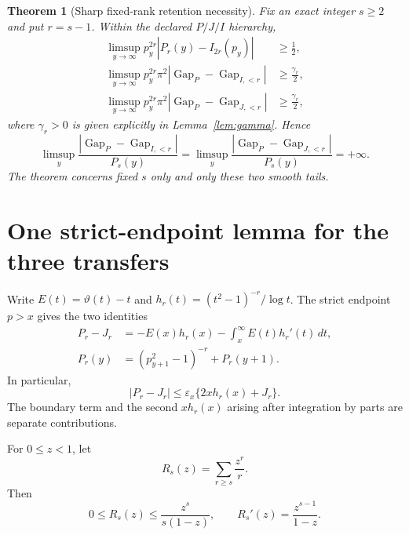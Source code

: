 \documentclass[11pt]{article}
\newtheorem{theorem}{Theorem}[section]
\theoremstyle{definition}
\theoremstyle{remark}
\newcommand{\eps}{\varepsilon}
\newcommand{\GapP}{\operatorname{Gap}_{P}}
\newcommand{\GapIr}{\operatorname{Gap}_{I,<r}}
\newcommand{\GapJr}{\operatorname{Gap}_{J,<r}}
\begin{document}
\begin{theorem}[Sharp fixed-rank retention necessity]
\label{thm:necessity}
Fix an exact integer $s\ge2$ and put $r=s-1$.  Within the declared
$P/J/I$ hierarchy,
\begin{align}
 \limsup_{y\to\infty}p_y^{2r}|P_r(y)-I_{2r}(p_y)|&\ge\frac12,
 \label{eq:scalar-necessity}\\
 \limsup_{y\to\infty}p_y^{2r}\pi^2|\GapP-\GapIr|
 &\ge\frac{\gamma_r}{2},
 \label{eq:I-necessity}\\
 \limsup_{y\to\infty}p_y^{2r}\pi^2|\GapP-\GapJr|
 &\ge\frac{\gamma_r}{2},
 \label{eq:J-necessity}
\end{align}
where $\gamma_r>0$ is given explicitly in
Lemma~\ref{lem:gamma}.  Hence
\begin{equation}
 \limsup_y\frac{|\GapP-\GapIr|}{P_s(y)}
 =\limsup_y\frac{|\GapP-\GapJr|}{P_s(y)}=+\infty.
 \label{eq:necessity-ratios}
\end{equation}
The theorem concerns fixed $s$ only and only these two smooth tails.
\end{theorem}

\section{One strict-endpoint lemma for the three transfers}

Write $E(t)=\vartheta(t)-t$ and
$h_r(t)=(t^2-1)^{-r}/\log t$.  The strict endpoint $p>x$ gives the two
identities
\begin{align}
 P_r-J_r&=-E(x)h_r(x)-\int_x^\infty E(t)h_r'(t)\,dt,
 \label{eq:strict-stieltjes}\\
 P_r(y)&=(p_{y+1}^2-1)^{-r}+P_r(y+1).
 \label{eq:strict-successor}
\end{align}
In particular,
\begin{equation}
 |P_r-J_r|\le\eps_x\{2xh_r(x)+J_r\}.
 \label{eq:strict-bound}
\end{equation}
The boundary term and the second $xh_r(x)$ arising after integration by
parts are separate contributions.

For $0\le z<1$, let
\begin{equation}
 R_s(z)=\sum_{r\ge s}\frac{z^r}{r}.
 \label{eq:Rs}
\end{equation}
Then
\begin{equation}
 0\le R_s(z)\le\frac{z^s}{s(1-z)},\qquad
 R_s'(z)=\frac{z^{s-1}}{1-z}.
 \label{eq:Rs-bounds}
\end{equation}
\end{document}
